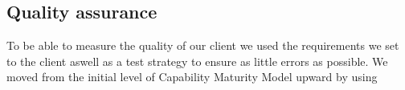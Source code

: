 \subsection{Quality assurance}
To be able to measure the quality of our client we used the requirements we set to the client aswell as a test strategy to ensure as little errors as possible. We moved from the initial level of Capability Maturity Model upward by using  